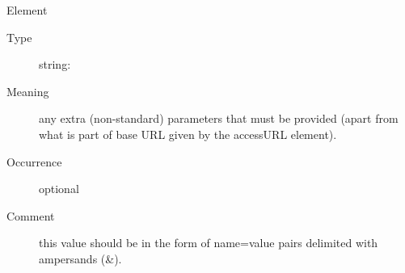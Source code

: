 \documentclass[11pt,a4paper]{ivoa}
\begin{document}
\begin{generated}
\begin{bigdescription}
\begin{description}
\end{description}
\item[Element \xmlel{extras}]
\begin{description}
\item[Type] string: 
\item[Meaning] 
                   any extra (non-standard) parameters that must be 
                   provided (apart from what is part of base URL given 
                   by the accessURL element).
               
\item[Occurrence] optional
\item[Comment] 
                   this value should be in the form of name=value
                   pairs delimited with ampersands (\&).  
               

\end{description}


\end{bigdescription}\endgroup

\endgroup
\end{generated}


\appendix
\end{document}
